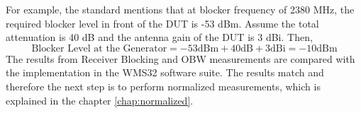 For example, the standard mentions that at blocker frequency of 2380 MHz, the required blocker level in front of the \acs{DUT} is -53 dBm. Assume the total attenuation is 40 dB and the antenna gain of the \acs{DUT} is 3 dBi. Then,
$$\mbox{Blocker Level at the Generator} = -53 \mbox{dBm} + 40 \mbox{dB}+ 3 \mbox{dBi} = -10 \mbox{dBm}$$ 
The results from Receiver Blocking and \acf{OBW} measurements are compared with the implementation in the WMS32 software suite. The results match and therefore the next step is to perform normalized measurements, which is explained in the chapter \ref{chap:normalized}.






